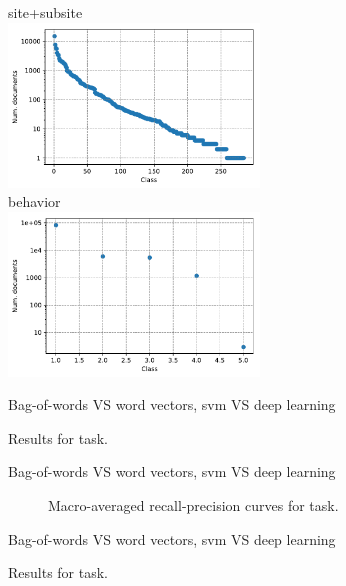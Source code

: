 \begin{frame}
  \centering
  site+subsite\\
  \includegraphics[width=0.5\textwidth]{../img/classDist-icdo3-fullSite-noTit.pdf}\\
  behavior\\
  \includegraphics[width=0.5\textwidth]{../img/classDist-icdo3-behaviour-noTit.pdf}
\end{frame}

  
\begin{frame}{Bag-of-words VS word vectors, \acs{svm} VS deep learning}
\begin{table}
  \centering
  \caption{Results for \fullSite{} task.}
  \footnotesize
  
\end{table}
\end{frame}

\begin{frame}{Bag-of-words VS word vectors, \acs{svm} VS deep learning}
\begin{figure}
  \centering
  \resizebox{0.9\textwidth}{!}{}
  \caption{Macro-averaged recall-precision curves for \fullSite{} task.}
\end{figure}

\end{frame}

\begin{frame}{Bag-of-words VS word vectors, \acs{svm} VS deep learning}
\begin{table}
  \centering
  \caption{Results for \type{} task.}
  \footnotesize
  
\end{table}
\end{frame}

